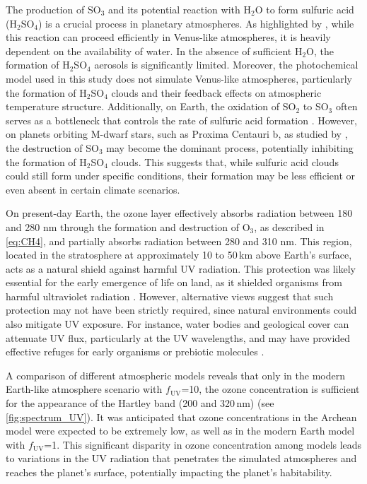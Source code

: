 The production of SO$_3$ and its potential reaction with H$_2$O to form sulfuric acid (H$_2$SO$_4$) is a crucial process in planetary atmospheres. As highlighted by \cite{Meadows.et.al.2018}, while this reaction can proceed efficiently in Venus-like atmospheres, it is heavily dependent on the availability of water. In the absence of sufficient H$_2$O, the formation of H$_2$SO$_4$ aerosols is significantly limited. Moreover, the photochemical model used in this study does not simulate Venus-like atmospheres, particularly the formation of H$_2$SO$_4$ clouds and their feedback effects on atmospheric temperature structure.
Additionally, on Earth, the oxidation of SO$_2$ to SO$_3$ often serves as a bottleneck that controls the rate of sulfuric acid formation \citep{Lizzio.and.DeBarr.1997}. However, on planets orbiting M-dwarf stars, such as Proxima Centauri b, as studied by \cite{Meadows.et.al.2018}, the destruction of SO$_3$ may become the dominant process, potentially inhibiting the formation of H$_2$SO$_4$ clouds. This suggests that, while sulfuric acid clouds could still form under specific conditions, their formation may be less efficient or even absent in certain climate scenarios.

On present-day Earth, the ozone layer effectively absorbs radiation between 180 and 280 nm through the formation and destruction of O$_3$, as described in \autoref{eq:CH4}, and partially absorbs radiation between 280 and 310 nm.
This region, located in the stratosphere at approximately 10 to 50\,km above Earth's surface, acts as a natural shield against harmful UV radiation. 
This protection was likely essential for the early emergence of life on land, as it shielded organisms from harmful ultraviolet radiation \citep{Cockell.2000P&SS...48..203C}. However, alternative views suggest that such protection may not have been strictly required, since natural environments could also mitigate UV exposure. For instance, water bodies and geological cover can attenuate UV flux, particularly at the UV wavelengths, and may have provided effective refuges for early organisms or prebiotic molecules \citep{Estrela2018, Estrela2020, Ranjan.et.al.2022AsBio..22..242R}.

A comparison of different atmospheric models reveals that only in the modern Earth-like atmosphere scenario with $f_\mathrm{UV}$=10, the ozone concentration is sufficient for the appearance of the Hartley band (200 and 320\,nm) (see \autoref{fig:spectrum_UV}). It was anticipated that ozone concentrations in the Archean model were expected to be extremely low, as well as in the modern Earth model with $f_\mathrm{UV}$=1.
This significant disparity in ozone concentration among models leads to variations in the UV radiation that penetrates the simulated atmospheres and reaches the planet's surface, potentially impacting the planet's habitability.

